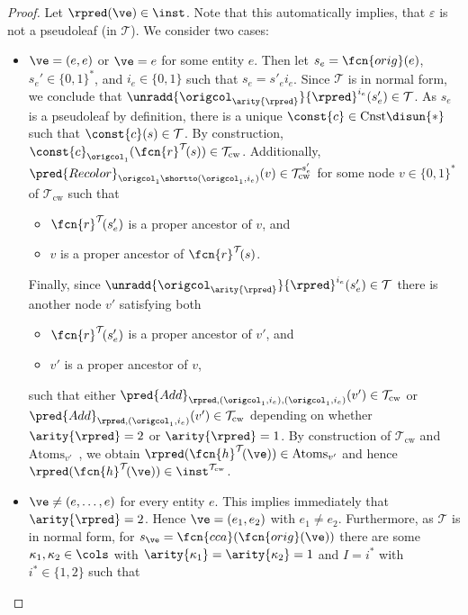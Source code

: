 \begin{proof}
	
	Let $\rpred(\ve)\in\inst$. Note that this automatically implies, that $\varepsilon$ is not a pseudoleaf (in $\mathcal{T}$). We consider two cases:
	\begin{itemize}
		\item $\ve = (e, e)$ or $\ve = e$ for some entity $e$. Then let $s_e = \fcn{orig}(e)$, $s_e'\in\{ 0,1 \}^*$, and $i_e\in\{ 0,1 \}$ such that $s_e = s'_ei_e$. Since $\mathcal{T}$ is in normal form, we conclude that $\unradd{\origcol_{\arity{\rpred}}}{\rpred}^{i_e}(s_e')\in\mathcal{T}$. As $s_e$ is a pseudoleaf by definition, there is a unique $\const{c}\in\mathrm{Cnst}\disun \{ \ast \}$ such that $\const{c}(s)\in\mathcal{T}$. By construction, $\const{c}_{\origcol_1}(\fcn{r}^{\mathcal{T}}\!(s))\in\mathcal{T}_{\mathrm{cw}}$. Additionally, $\pred{Recolor}_{\origcol_{1} \shortto (\origcol_1, i_e)}(v)\in\mathcal{T}^{s_e'}_{\mathrm{cw}}$ for some node $v\in\{ 0,1 \}^{\ast}$ of $\mathcal{T}_{\mathrm{cw}}$ such that 
		\begin{itemize}
			\item $\fcn{r}^{\mathcal{T}}\!(s'_e)$ is a proper ancestor of $v$, and
			\item $v$ is a proper ancestor of $\fcn{r}^{\mathcal{T}}\!(s)$.
		\end{itemize}
		Finally, since $\unradd{\origcol_{\arity{\rpred}}}{\rpred}^{i_e}(s_e')\in\mathcal{T}$ there is another node $v'$ satisfying both 
		\begin{itemize}
			\item $\fcn{r}^{\mathcal{T}}\!(s'_e)$ is a proper ancestor of $v'$, and
			\item $v'$ is a proper ancestor of $v$,
		\end{itemize}
		such that either $\pred{Add}_{\rpred, (\origcol_1, i_e), (\origcol_1, i_e)}(v')\in\mathcal{T}_{\mathrm{cw}}$ or $\pred{Add}_{\rpred, (\origcol_1, i_e)}(v')\in\mathcal{T}_{\mathrm{cw}}$ depending on whether $\arity{\rpred}= 2$ or $\arity{\rpred}= 1$. By construction of $\mathcal{T}_{\mathrm{cw}}$ and $\mathrm{Atoms}_{v'}$~\cite[Definition 7]{ICDT2023}, we obtain $\rpred(\fcn{h}^{\mathcal{T}}\!(\ve))\in\mathrm{Atoms}_{v'}$ and hence $\rpred(\fcn{h}^{\mathcal{T}}\!(\ve))\in\inst^{\mathcal{T}_{\mathrm{cw}}}$.
		\item $\ve \neq (e, \ldots, e)$ for every entity $e$. This implies immediately that $\arity{\rpred} = 2$. Hence $\ve = (e_1, e_2)$ with $e_1\neq e_2$. Furthermore, as $\mathcal{T}$ is in normal form, for $s_{\ve} = \fcn{cca}(\fcn{orig}(\ve))$ there are some $\kappa_1, \kappa_2\in\cols$ with $\arity{\kappa_1} = \arity{\kappa_2} = 1$ and $I = {i^*}$ with $i^*\in\{ 1,2 \}$ such that 

\end{itemize}
\end{proof}
